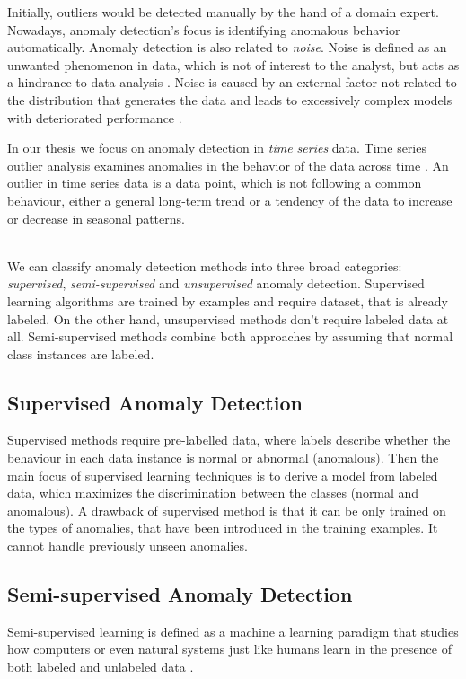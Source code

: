 Initially, outliers would be detected manually by the hand of a domain expert. Nowadays, anomaly detection's focus is identifying anomalous behavior automatically. Anomaly detection is also related to \textit{noise}. Noise is defined as an unwanted phenomenon in data, which is not of interest to the analyst, but acts as a hindrance to data analysis \cite{cvbakv2009}. Noise is  caused by an external factor not related to the distribution that generates the data \cite{ggh2017} and leads to excessively complex models with deteriorated performance \cite{wu2007}. 

In our thesis we focus on anomaly detection in \textit{time series} data. Time series outlier analysis examines anomalies in the behavior of the data across time \cite{gupta2014}. An outlier in time series data is a data point, which is not following a common behaviour, either a general long-term trend or a tendency of the data to increase or decrease in seasonal patterns. 

\\
We can classify anomaly detection methods into three broad categories: \textit{supervised}, \textit{semi-supervised} and \textit{unsupervised} anomaly detection. Supervised learning algorithms are trained by examples and require dataset, that is already labeled. On the other hand, unsupervised methods don't require labeled data at all. Semi-supervised methods combine both approaches by assuming that normal class instances are labeled.


\subsection{Supervised Anomaly Detection}
Supervised methods require pre-labelled data, where labels describe whether the behaviour in each data instance is normal or abnormal (anomalous). Then the main focus of supervised learning techniques is to derive a model from labeled data, which maximizes the discrimination between the classes (normal and anomalous). A drawback of supervised method is that it can be only trained on the types of anomalies, that have been introduced in the training examples. It cannot handle previously unseen anomalies. 

 \subsection{Semi-supervised Anomaly Detection}
 Semi-supervised learning is defined as a machine a learning paradigm that studies how computers or even natural systems just like humans learn in the presence of both labeled and unlabeled data \cite{zhu2009introduction}.
 

